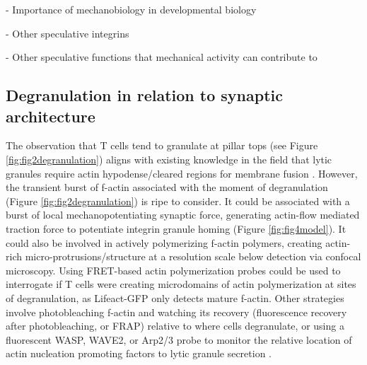 - Importance of mechanobiology in developmental biology

- Other speculative integrins

- Other speculative functions that mechanical activity can contribute to

\subsection{Degranulation in relation to synaptic architecture}
The observation that T cells tend to granulate at pillar tops (see Figure \ref{fig:fig2degranulation}) aligns with existing knowledge in the field that lytic granules require actin hypodense/cleared regions for membrane fusion \cite{Ritter2015}.  However, the transient burst of f-actin associated with the moment of degranulation (Figure \ref{fig:fig2degranulation}) is ripe to consider.  It could be associated with a burst of local mechanopotentiating synaptic force,  generating actin-flow mediated traction force to potentiate integrin granule homing (Figure \ref{fig:fig4model}). It could also be involved in actively polymerizing f-actin polymers, creating actin-rich micro-protrusions/structure at a resolution scale below detection via confocal microscopy.  Using FRET-based actin polymerization probes could be used to interrogate if T cells were creating microdomains of actin polymerization at sites of degranulation,  as Lifeact-GFP only detects mature f-actin.  Other strategies involve photobleaching f-actin and watching its recovery (fluorescence recovery after photobleaching, or FRAP) \cite{Simon1988} relative to where cells degranulate, or using a fluorescent WASP, WAVE2, or Arp2/3 probe to monitor the relative location of actin nucleation promoting factors to lytic granule secretion \cite{Obino2016, Tamzalit2018}. 

